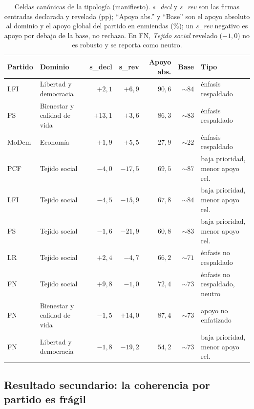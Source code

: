 \begin{table}[H]
\centering
\caption{Celdas canónicas de la tipología (manifiesto). \emph{s\_decl} y
\emph{s\_rev} son las firmas centradas declarada y revelada (pp); ``Apoyo abs.'' y
``Base'' son el apoyo absoluto al dominio y el apoyo global del partido en
enmiendas (\%); un \emph{s\_rev} negativo es apoyo por debajo de la base, no
rechazo. En FN, \emph{Tejido social} revelado ($-1{,}0$) no es robusto y se
reporta como neutro.}
\label{tab:cruce-casos}
\small
\begin{tabularx}{\textwidth}{@{}l >{\raggedright\arraybackslash}X r r r r >{\raggedright\arraybackslash}X@{}}
\toprule
\textbf{Partido} & \textbf{Dominio} & \textbf{s\_decl} & \textbf{s\_rev} & \textbf{Apoyo abs.} & \textbf{Base} & \textbf{Tipo} \\
\midrule
LFI & Libertad y democracia & $+2{,}1$ & $+6{,}9$ & $90{,}6$ & $\sim 84$ & énfasis respaldado \\
PS & Bienestar y calidad de vida & $+13{,}1$ & $+3{,}6$ & $86{,}3$ & $\sim 83$ & énfasis respaldado \\
MoDem & Economía & $+1{,}9$ & $+5{,}5$ & $27{,}9$ & $\sim 22$ & énfasis respaldado \\
PCF & Tejido social & $-4{,}0$ & $-17{,}5$ & $69{,}5$ & $\sim 87$ & baja prioridad, menor apoyo rel. \\
LFI & Tejido social & $-4{,}5$ & $-15{,}9$ & $67{,}8$ & $\sim 84$ & baja prioridad, menor apoyo rel. \\
PS & Tejido social & $-1{,}6$ & $-21{,}9$ & $60{,}8$ & $\sim 83$ & baja prioridad, menor apoyo rel. \\
LR & Tejido social & $+2{,}4$ & $-4{,}7$ & $66{,}2$ & $\sim 71$ & énfasis no respaldado \\
FN & Tejido social & $+9{,}8$ & $-1{,}0$ & $72{,}4$ & $\sim 73$ & énfasis no respaldado, neutro \\
FN & Bienestar y calidad de vida & $-1{,}5$ & $+14{,}0$ & $87{,}4$ & $\sim 73$ & apoyo no enfatizado \\
FN & Libertad y democracia & $-1{,}8$ & $-19{,}2$ & $54{,}2$ & $\sim 73$ & baja prioridad, menor apoyo rel. \\
\bottomrule
\end{tabularx}
\end{table}

\subsection{Resultado secundario: la coherencia por partido es frágil}
\label{sec:res-cruce-coherencia}

